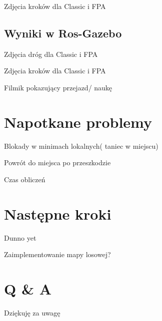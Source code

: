 \documentclass[aspectratio=169,15pt,]{beamer}
\begin{document}
\begin{frame}
Zdjęcia kroków dla Classic i FPA
\end{frame}

\subsection{Wyniki w Ros-Gazebo}
\begin{frame}
	\subsectionpage
\end{frame}

\begin{frame}
Zdjęcia dróg dla Classic i FPA
\end{frame}

\begin{frame}
Zdjęcia kroków dla Classic i FPA
\end{frame}

\begin{frame}
Filmik pokazujący przejazd/ naukę
\end{frame}

\section{Napotkane problemy}
\begin{frame}
	\sectionpage
\end{frame}

\begin{frame}
Blokady w minimach lokalnych( taniec w miejscu)

Powrót do miejsca po przeszkodzie

Czas obliczeń

\end{frame}

\section{Następne kroki}
\begin{frame}
	\sectionpage
\end{frame}

\begin{frame}
Dunno yet

Zaimplementowanie mapy losowej?
\end{frame}

\section{Q \& A}
\begin{frame}
	\sectionpage

\end{frame}

\begin{frame}
\begin{center}
	\Huge{Dziękuję za uwagę}

\end{center}

\end{frame}
\end{document}
